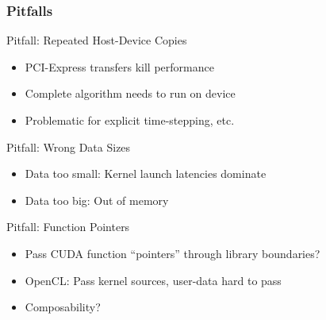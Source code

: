 \begin{frame}[fragile]
\frametitle{Pitfalls}
  \begin{block}{Pitfall: Repeated Host-Device Copies}
  \begin{itemize}
   \item PCI-Express transfers kill performance
   \item Complete algorithm needs to run on device
   \item Problematic for explicit time-stepping, etc.
  \end{itemize}
  \end{block}

  
  \begin{block}{Pitfall: Wrong Data Sizes}
  \begin{itemize}
   \item Data too small: Kernel launch latencies dominate
   \item Data too big: Out of memory
  \end{itemize}
  \end{block}

  
  \begin{block}{Pitfall: Function Pointers}
  \begin{itemize}
   \item Pass CUDA function ``pointers'' through library boundaries?
   \item OpenCL: Pass kernel sources, user-data hard to pass
   \item Composability?
  \end{itemize}
  \end{block}

\end{frame}


